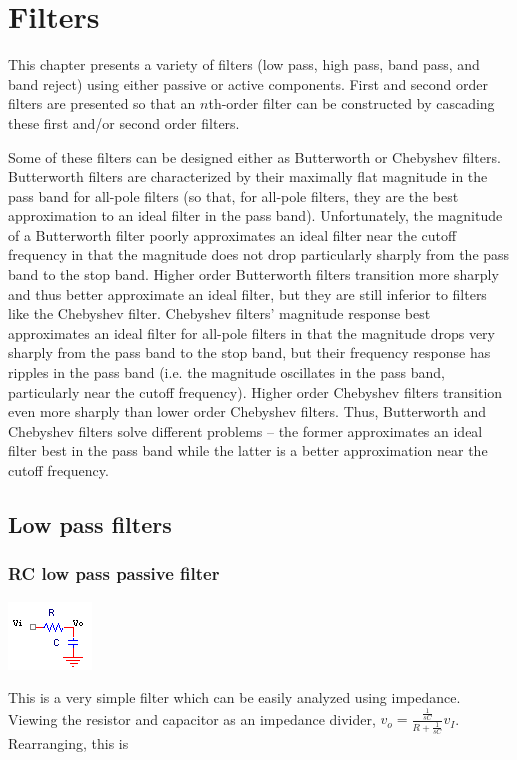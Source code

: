 \chapter{Filters}
This chapter presents a variety of filters (low pass, high pass, band pass, and band reject) using either passive or active components.
First and second order filters are presented so that an $n$th-order filter can be constructed by cascading these first and/or second order filters.

Some of these filters can be designed either as Butterworth or Chebyshev filters.
Butterworth filters are characterized by their maximally flat magnitude in the pass band for all-pole filters (so that, for all-pole filters, they are the best approximation to an ideal filter in the pass band).
Unfortunately, the magnitude of a Butterworth filter poorly approximates an ideal filter near the cutoff frequency in that the magnitude does not drop particularly sharply from the pass band to the stop band.
Higher order Butterworth filters transition more sharply and thus better approximate an ideal filter, but they are still inferior to filters like the Chebyshev filter.
Chebyshev filters' magnitude response best approximates an ideal filter for all-pole filters in that the magnitude drops very sharply from the pass band to the stop band, but their frequency response has ripples in the pass band (i.e. the magnitude oscillates in the pass band, particularly near the cutoff frequency).
Higher order Chebyshev filters transition even more sharply than lower order Chebyshev filters.
Thus, Butterworth and Chebyshev filters solve different problems -- the former approximates an ideal filter best in the pass band while the latter is a better approximation near the cutoff frequency. \autocite[107, 111]{op-amp-circuits-johnson}

\section{Low pass filters}

\subsection{RC low pass passive filter}
\begin{center}
	\includegraphics{schematics/rcLPfilter.PNG}
\end{center}
This is a very simple filter which can be easily analyzed using impedance. Viewing the resistor and capacitor as an impedance divider, $v_{o} = \frac{\frac{1}{sC}}{R+\frac{1}{sC}}v_{I}$. Rearranging, this is

